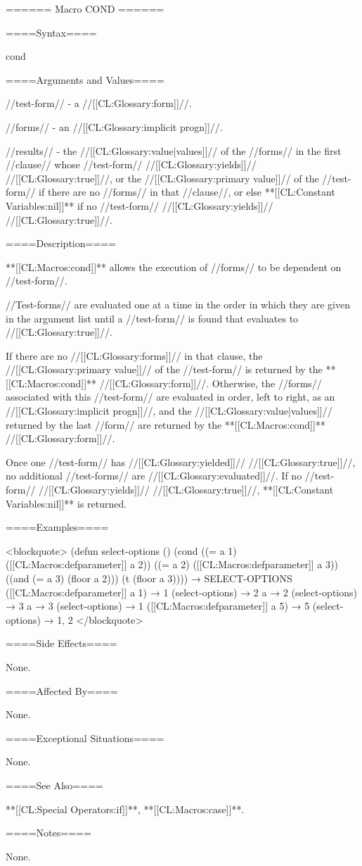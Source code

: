 ====== Macro COND ======

====Syntax====

\DefmacWithValues cond {} {}


====Arguments and Values====

//test-form// - a //[[CL:Glossary:form]]//.

//forms// - an //[[CL:Glossary:implicit progn]]//.

//results// - the //[[CL:Glossary:value|values]]// of the //forms// in the first //clause// whose //test-form// //[[CL:Glossary:yields]]// //[[CL:Glossary:true]]//, or the //[[CL:Glossary:primary value]]// of the //test-form// if there are no //forms// in that //clause//, or else **[[CL:Constant Variables:nil]]** if no //test-form// //[[CL:Glossary:yields]]// //[[CL:Glossary:true]]//.

====Description====

**[[CL:Macros:cond]]** allows the execution of //forms// to be dependent on //test-form//.

//Test-forms// are evaluated one at a time in the order in which they are given in the argument list until a //test-form// is found that evaluates to //[[CL:Glossary:true]]//.

If there are no //[[CL:Glossary:forms]]// in that clause, the //[[CL:Glossary:primary value]]// of the //test-form// is returned by the **[[CL:Macros:cond]]** //[[CL:Glossary:form]]//. Otherwise, the //forms// associated with this //test-form// are evaluated in order, left to right, as an //[[CL:Glossary:implicit progn]]//, and the //[[CL:Glossary:value|values]]// returned by the last //form// are returned by the **[[CL:Macros:cond]]** //[[CL:Glossary:form]]//.

Once one //test-form// has //[[CL:Glossary:yielded]]// //[[CL:Glossary:true]]//, no additional //test-forms// are //[[CL:Glossary:evaluated]]//. If no //test-form// //[[CL:Glossary:yields]]// //[[CL:Glossary:true]]//, **[[CL:Constant Variables:nil]]** is returned.

====Examples====

<blockquote> (defun select-options () (cond ((= a 1) ([[CL:Macros:defparameter]] a 2)) ((= a 2) ([[CL:Macros:defparameter]] a 3)) ((and (= a 3) (floor a 2))) (t (floor a 3)))) → SELECT-OPTIONS ([[CL:Macros:defparameter]] a 1) → 1 (select-options) → 2 a → 2 (select-options) → 3 a → 3 (select-options) → 1 ([[CL:Macros:defparameter]] a 5) → 5 (select-options) → 1, 2 </blockquote>

====Side Effects====

None.

====Affected By====

None.

====Exceptional Situations====

None.

====See Also====

**[[CL:Special Operators:if]]**, **[[CL:Macros:case]]**.

====Notes====

None.



